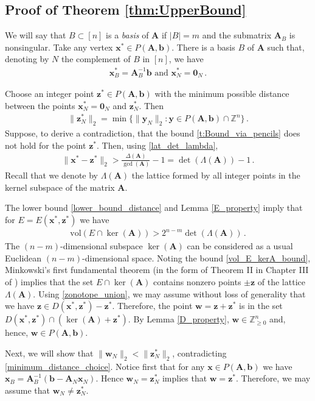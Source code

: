 \documentclass[runningheads]{llncs}
\newcommand{\ve}{\boldsymbol}
\newcommand{\be}{\begin{eqnarray}}
\newcommand{\bea}{\begin{eqnarray*}}
\newcommand{\ee}{\end{eqnarray}}
\newcommand{\eea}{\end{eqnarray*}}
\newcommand{\conv}{\mathrm{conv}}
\newcommand{\vol}{\mathrm{vol}}
\newcommand{\Z}{\mathbb Z}
\newcommand{\KP}{{P}}
\renewcommand\>{\rangle}
\newcommand\<{\langle}
\newcommand\0{\mathbf{0}}
\renewcommand\AA{\ve A}%
\begin{document}
\subsection{Proof of Theorem \ref{thm:UpperBound}}



We will say that $B\subset [n]$ is a {\em basis} of $\AA$ if $|B|=m$ and the submatrix $\AA_B$  is nonsingular. %
Take any vertex ${\ve x}^*\in \KP(\AA, {\ve b})$. There is a basis $B$ of $\AA$ such that, denoting by $N$ the complement of $B$ in $[n]$, we have
%
\bea %
 {\ve x}^*_B = \AA_B^{-1}{\ve b} \mbox{ and }{\ve x}^*_{N}={\ve 0}_{N}\,.
\eea
%


Choose an integer point ${\ve z}^*\in \KP(\AA, {\ve b})$ with the minimum possible distance between the points ${\ve x}^*_N={\ve 0}_{N}$ and ${\ve z}^*_N$. Then
\be\label{minimum_distance_choice}
\|{\ve z}^*_N\|_2=\min \{\|{\ve y}_N\|_2: {\ve y}\in \KP(\AA, {\ve b})\cap\Z^n\}\,.
\ee 
%
Suppose, to derive a contradiction, that the bound \eqref{t:Bound_via_pencils} does not hold for the point ${\ve z}^*$. Then, using \eqref{lat_det_lambda},
\be\label{lower_bound_distance}
\|{\ve x}^*-{\ve z}^*\|_2> \frac{\Delta(\AA)}{\gcd(\AA)}-1 = \det(\Lambda(\AA))-1\,.
\ee
Recall that we denote by $\Lambda(\AA)$ the  lattice formed by all integer points in the kernel subspace of the matrix $\AA$.

The lower bound \eqref{lower_bound_distance} and Lemma \ref{E_property}  imply that for $E=E({\ve x}^*, {\ve z}^*)$
we have
\be\label{vol_E_kerA_bound}
\vol(E\cap\ker(\AA))> 2^{n-m} \det(\Lambda(\AA))\,.
\ee
The $(n-m)$-dimensional subspace $\ker(\AA)$ can be considered as a usual Euclidean $(n-m)$-dimensional space. 
 Noting the bound \eqref{vol_E_kerA_bound}, Minkowski's first fundamental theorem (in the form of Theorem II in Chapter III of \cite{cassels1996introduction}) implies that the set $E\cap\ker(\AA)$
 contains nonzero points $\pm {\ve z}$ of the lattice $\Lambda(\AA)$. Using \eqref{zonotope_union}, we may assume without loss of generality
 that we have  ${\ve z}\in D({\ve x}^*, {\ve z}^*)-{\ve z}^*$. Therefore, the point ${\ve w}={\ve z}+{\ve z}^*$ is in the set $D({\ve x}^*, {\ve z}^*)\cap (\ker(\AA)+{\ve z}^*)$. By Lemma \ref{D_property}, ${\ve w}\in \Z^n_{\ge 0}$ and, hence, ${\ve w}\in \KP(\AA, {\ve b})$. 
 
 Next, we will show that
 $\|{\ve w}_N\|_2< \|{\ve z}^*_N\|_2$, contradicting \eqref{minimum_distance_choice}.
%
Notice first that for any ${\ve x}\in \KP(\AA, {\ve b})$ we have ${\ve x}_B=\AA_B^{-1}({\ve b}-\AA_N{\ve x}_N)$. Hence ${\ve w}_N = {\ve z}^*_N$ implies that  ${\ve w}={\ve z}^*$.
%
Therefore, we may assume that ${\ve w}_N \neq {\ve z}^*_N$. 
%
\end{document}
